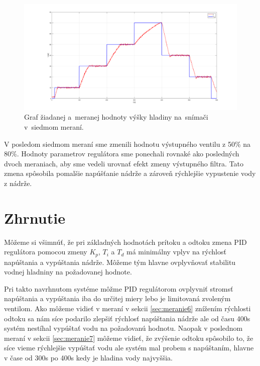\documentclass{article}
\begin{document}
\begin{figure}[!htbp]
	\begin{center}
		\includegraphics[width=\textwidth]{./include/meranie7.png}
	\end{center}
	\caption{Graf žiadanej a~meranej hodnoty výšky hladiny na~snímači v~siedmom meraní.}
	\label{fig:m7}
\end{figure}

V posledom siedmom meraní sme zmenili hodnotu výstupného ventilu z 50\% na 80\%. Hodnoty parametrov
regulátora sme ponechali rovnaké ako posledných dvoch meraniach, aby sme vedeli urovnať efekt zmeny
výstupného filtra. Tato zmena spôsobila pomalšie napúšťanie nádrže a zároveň rýchlejšie vypustenie
vody z nádrže.

\clearpage

\section{Zhrnutie}
\label{sec:zhrnutie}


Môžeme si všimnúť, že pri základných hodnotách prítoku a odtoku zmena PID regulátora pomocou zmeny $K_p$, $T_i$ a $T_d$ má minimálny vplyv na rýchlosť napúštania a vypúštania nádrže. Môžeme tým hlavne ovplyvňovať stabilitu vodnej hladniny na požadovanej hodnote. 

Pri takto navrhnutom systéme môžme PID regulátorom ovplyvniť stromsť napúštania a vypúštania iba do určitej miery lebo je limitovaná zvoleným ventilom. Ako môžeme vidieť v meraní v sekcii \ref{sec:meranie6} znížením rýchlosti odtoku sa nám síce podarilo zlepšiť rýchlosť napúštania nádrže ale od času 400s systém nestíhal vypúštať vodu na požadovanú hodnotu. Naopak v poslednom meraní v sekcii \ref{sec:meranie7} môžeme vidieť, že zvýšenie odtoku spôsobilo to, že síce vieme rýchlejšie vypúštať vodu ale systém mal probem s napúštaním, hlavne v čase od 300s po 400s kedy je hladina vody najvyššia.
\end{document}
